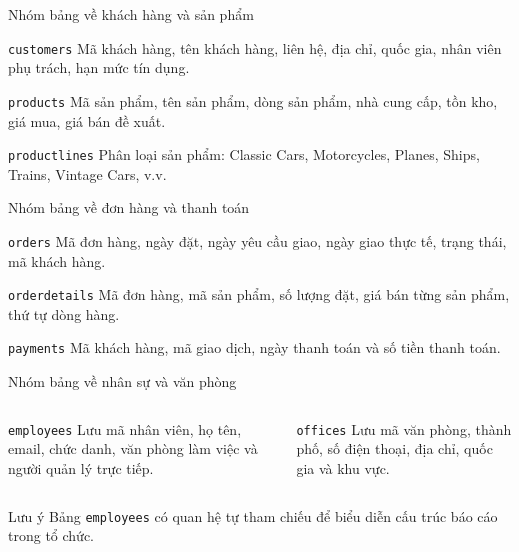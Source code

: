 \documentclass[aspectratio=169,professionalfonts]{beamer}
\newcommand{\code}[1]{\texttt{#1}}
\begin{document}
\begin{frame}{Nhóm bảng về khách hàng và sản phẩm}
\footnotesize
\begin{block}{\code{customers}}
Mã khách hàng, tên khách hàng, liên hệ, địa chỉ, quốc gia, nhân viên phụ trách, hạn mức tín dụng.
\end{block}
\vspace{0.45em}
\begin{block}{\code{products}}
Mã sản phẩm, tên sản phẩm, dòng sản phẩm, nhà cung cấp, tồn kho, giá mua, giá bán đề xuất.
\end{block}
\vspace{0.45em}
\begin{block}{\code{productlines}}
Phân loại sản phẩm: Classic Cars, Motorcycles, Planes, Ships, Trains, Vintage Cars, v.v.
\end{block}
\end{frame}

\begin{frame}{Nhóm bảng về đơn hàng và thanh toán}
\footnotesize
\begin{block}{\code{orders}}
Mã đơn hàng, ngày đặt, ngày yêu cầu giao, ngày giao thực tế, trạng thái, mã khách hàng.
\end{block}
\vspace{0.45em}
\begin{block}{\code{orderdetails}}
Mã đơn hàng, mã sản phẩm, số lượng đặt, giá bán từng sản phẩm, thứ tự dòng hàng.
\end{block}
\vspace{0.45em}
\begin{block}{\code{payments}}
Mã khách hàng, mã giao dịch, ngày thanh toán và số tiền thanh toán.
\end{block}
\end{frame}

\begin{frame}{Nhóm bảng về nhân sự và văn phòng}
\begin{columns}[T,onlytextwidth]
\begin{block}{\code{employees}}
Lưu mã nhân viên, họ tên, email, chức danh, văn phòng làm việc và người quản lý trực tiếp.
\end{block}
\begin{block}{\code{offices}}
Lưu mã văn phòng, thành phố, số điện thoại, địa chỉ, quốc gia và khu vực.
\end{block}
\end{columns}
\vspace{0.5em}
\begin{alertblock}{Lưu ý}
Bảng \code{employees} có quan hệ tự tham chiếu để biểu diễn cấu trúc báo cáo trong tổ chức.
\end{alertblock}
\end{frame}
\end{document}
